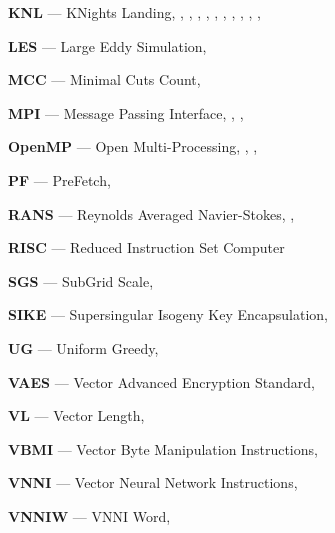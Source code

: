 \textbf{KNL} --- KNights Landing, \pageref{abbr:knl}, \pageref{abbr:knl2}, \pageref{abbr:knl3}, \pageref{abbr:knl4}, \pageref{abbr:knl5}, \pageref{abbr:knl6}, \pageref{abbr:knl7}, \pageref{abbr:knl8}, \pageref{abbr:knl9}, \pageref{abbr:knl10}, \pageref{abbr:knl11}

\textbf{LES} --- Large Eddy Simulation, \pageref{abbr:les}

\textbf{MCC} --- Minimal Cuts Count, \pageref{abbr:mcc}

\textbf{MPI} --- Message Passing Interface, \pageref{abbr:mpi}, \pageref{abbr:mpi2}, \pageref{abbr:mpi3}

\textbf{OpenMP} --- Open Multi-Processing, \pageref{abbr:openmp}, \pageref{abbr:openmp2}, \pageref{abbr:openmp3}

\textbf{PF} --- PreFetch, \pageref{abbr:pf}

\textbf{RANS} --- Reynolds Averaged Navier-Stokes, \pageref{abbr:rans}, \pageref{abbr:rans2}

\textbf{RISC} --- Reduced Instruction Set Computer

\textbf{SGS} --- SubGrid Scale, \pageref{abbr:sgs}

\textbf{SIKE} --- Supersingular Isogeny Key Encapsulation, \pageref{abbr:sike}

\textbf{UG} --- Uniform Greedy, \pageref{abbr:ug}

\textbf{VAES} --- Vector Advanced Encryption Standard, \pageref{abbr:vaes}

\textbf{VL} --- Vector Length, \pageref{abbr:vl}

\textbf{VBMI} --- Vector Byte Manipulation Instructions, \pageref{abbr:vbmi}

\textbf{VNNI} --- Vector Neural Network Instructions, \pageref{abbr:vnni}

\textbf{VNNIW} --- VNNI Word, \pageref{abbr:vnniw}
